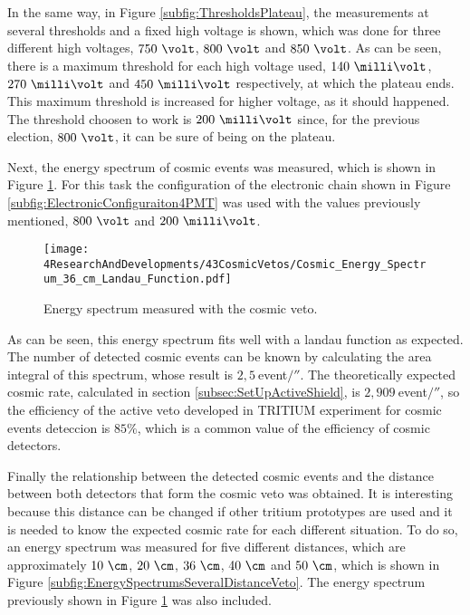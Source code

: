 In the same way, in Figure \ref{subfig:ThresholdsPlateau}, the measurements at several thresholds and a fixed high voltage is shown, which was done for three different high voltages, $750~\volt$, $800~\volt$ and $850~\volt$. As can be seen, there is a maximum threshold for each high voltage used,  $140~\milli\volt$, $270~\milli\volt$ and $450~\milli\volt$ respectively, at which the plateau ends. This maximum threshold is increased for higher voltage, as it should happened. The threshold choosen to work is $200~\milli\volt$ since, for the previous election, $800~\volt$, it can be sure of being on the plateau. 

Next, the energy spectrum of cosmic events was measured, which is shown in Figure \ref{fig:EnergySpectrumCosmicVeto}. For this task the configuration of the electronic chain shown in Figure \ref{subfig:ElectronicConfiguraiton4PMT} was used with the values previously mentioned, $800~\volt$ and $200~\milli\volt$. 

\begin{figure}[h]
\centering
\texttt{[image: 4ResearchAndDevelopments/43CosmicVetos/Cosmic\_Energy\_Spectrum\_36\_cm\_Landau\_Function.pdf]}
\caption{Energy spectrum measured with the cosmic veto.\label{fig:EnergySpectrumCosmicVeto}}
\end{figure}

As can be seen, this energy spectrum fits well with a landau function as expected. The number of detected cosmic events can be known by calculating the area integral of this spectrum, whose result is $2,5~$event$/\second$. The theoretically expected cosmic rate, calculated in section \ref{subsec:SetUpActiveShield}, is $2,909~$event$/\second$, so the efficiency of the active veto developed in TRITIUM experiment for cosmic events deteccion is $85\%$, which is a common value of the efficiency of cosmic detectors.

Finally the relationship between the detected cosmic events and the distance between both detectors that form the cosmic veto was obtained. It is interesting because this distance can be changed if other tritium prototypes are used and it is needed to know the expected cosmic rate for each different situation. To do so, an energy spectrum was measured for five different distances, which are approximately $10~\cm$, $20~\cm$, $36~\cm$, $40~\cm$ and $50~\cm$, which is shown in Figure \ref{subfig:EnergySpectrumsSeveralDistanceVeto}. The energy spectrum previously shown in Figure \ref{fig:EnergySpectrumCosmicVeto} was also included. 


